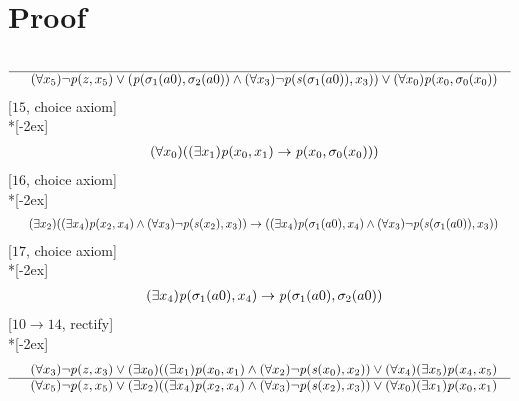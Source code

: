 \documentclass[fleqn]{article}
\newenvironment{VampireProof}{%
   \section{Proof}}{}
\newenvironment{VampireInference}{%
   \begin{array}{c}}{\end{array}}
\newenvironment{VampirePremise}%
   {\begin{array}{l}}%
   {\end{array}}
\newenvironment{VampireConclusion}%
   {\begin{array}{l}}%
   {\end{array}}
\newcommand{\VConclusionSeparator}{\\ \hline}
\newcommand{\Vor}{\vee}
\newcommand{\Vand}{\wedge}
\newcommand{\Vimp}{\rightarrow}
\begin{document}
\begin{VampireProof}
\[\begin{VampireInference}
\VConclusionSeparator
\begin{VampireConclusion}
~~(\forall x_{5} )\neg \mathit{p} (\mathit{z},x_{5}) \Vor (\mathit{p} (\sigma_{1}(a0),\sigma_{2}(a0)) \Vand (\forall x_{3} )\neg \mathit{p} (\mathit{s} (\sigma_{1}(a0)),x_{3})) \Vor (\forall x_{0} )\mathit{p} (x_{0},\sigma_{0}(x_{0}))
\end{VampireConclusion}
\end{VampireInference}
\]
[$15$, choice axiom]\\*[-2ex]
\[\begin{VampireInference}
\begin{VampireConclusion}
~~(\forall x_{0} )((\exists x_{1} )\mathit{p} (x_{0},x_{1}) \Vimp \mathit{p} (x_{0},\sigma_{0}(x_{0})))
\end{VampireConclusion}
\end{VampireInference}
\]
[$16$, choice axiom]\\*[-2ex]
\[\begin{VampireInference}
\begin{VampireConclusion}
~~(\exists x_{2} )((\exists x_{4} )\mathit{p} (x_{2},x_{4}) \Vand (\forall x_{3} )\neg \mathit{p} (\mathit{s} (x_{2}),x_{3})) \Vimp ((\exists x_{4} )\mathit{p} (\sigma_{1}(a0),x_{4}) \Vand (\forall x_{3} )\neg \mathit{p} (\mathit{s} (\sigma_{1}(a0)),x_{3}))
\end{VampireConclusion}
\end{VampireInference}
\]
[$17$, choice axiom]\\*[-2ex]
\[\begin{VampireInference}
\begin{VampireConclusion}
~~(\exists x_{4} )\mathit{p} (\sigma_{1}(a0),x_{4}) \Vimp \mathit{p} (\sigma_{1}(a0),\sigma_{2}(a0))
\end{VampireConclusion}
\end{VampireInference}
\]
[$10\rightarrow 14$, rectify]\\*[-2ex]
\[\begin{VampireInference}
\begin{VampirePremise}%
~~(\forall x_{3} )\neg \mathit{p} (\mathit{z},x_{3}) \Vor (\exists x_{0} )((\exists x_{1} )\mathit{p} (x_{0},x_{1}) \Vand (\forall x_{2} )\neg \mathit{p} (\mathit{s} (x_{0}),x_{2})) \Vor (\forall x_{4} )(\exists x_{5} )\mathit{p} (x_{4},x_{5})
\end{VampirePremise}
\VConclusionSeparator
\begin{VampireConclusion}
~~(\forall x_{5} )\neg \mathit{p} (\mathit{z},x_{5}) \Vor (\exists x_{2} )((\exists x_{4} )\mathit{p} (x_{2},x_{4}) \Vand (\forall x_{3} )\neg \mathit{p} (\mathit{s} (x_{2}),x_{3})) \Vor (\forall x_{0} )(\exists x_{1} )\mathit{p} (x_{0},x_{1})

\end{VampireConclusion}
\end{VampireInference}\]
\end{VampireProof}
\end{document}
